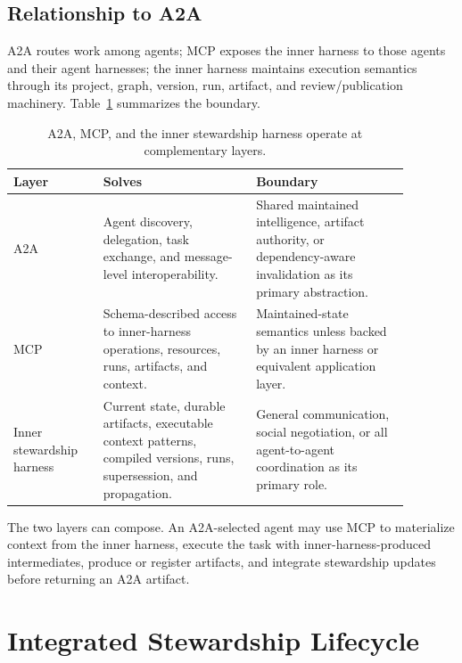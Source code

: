 \documentclass{article}
\begin{document}
\subsection{Relationship to A2A}

A2A routes work among agents; MCP exposes the inner harness to those agents and their agent harnesses; the inner harness maintains execution semantics through its project, graph, version, run, artifact, and review/publication machinery. Table~\ref{tab:layers} summarizes the boundary.

\begin{table}[H]
\centering
\small
\begin{tabular}{p{0.20\linewidth}p{0.34\linewidth}p{0.34\linewidth}}
\toprule
\textbf{Layer} & \textbf{Solves} & \textbf{Boundary} \\
\midrule
A2A & Agent discovery, delegation, task exchange, and message-level interoperability. & Shared maintained intelligence, artifact authority, or dependency-aware invalidation as its primary abstraction. \\
MCP & Schema-described access to inner-harness operations, resources, runs, artifacts, and context. & Maintained-state semantics unless backed by an inner harness or equivalent application layer. \\
Inner stewardship harness & Current state, durable artifacts, executable context patterns, compiled versions, runs, supersession, and propagation. & General communication, social negotiation, or all agent-to-agent coordination as its primary role. \\
\bottomrule
\end{tabular}
\caption{A2A, MCP, and the inner stewardship harness operate at complementary layers.}
\label{tab:layers}
\end{table}

The two layers can compose. An A2A-selected agent may use MCP to materialize context from the inner harness, execute the task with inner-harness-produced intermediates, produce or register artifacts, and integrate stewardship updates before returning an A2A artifact.

\section{Integrated Stewardship Lifecycle}
\label{sec:lifecycle}
\end{document}
